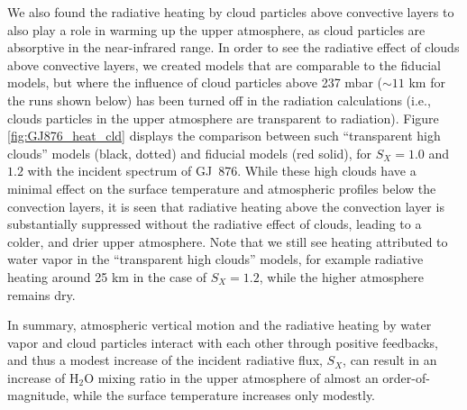 \documentclass[11pt,numberedappendix,twocolappendix,]{emulateapj}
\def\water{H$_2$O }
\newcommand{\dsa}[1]{{\color{blue}#1}}
\begin{document}
We also found the radiative heating by cloud particles above convective layers to also play a role in warming up the upper atmosphere, as cloud particles are absorptive in the near-infrared range. 
In order to see the radiative effect of clouds above convective layers, we created models that are comparable to the fiducial models, but where the  influence of cloud particles above 237 mbar ($\sim 11$ km for the runs shown below) has been turned off in the radiation calculations (i.e., clouds particles in the upper atmosphere are transparent to radiation). 
Figure \ref{fig:GJ876_heat_cld} displays the comparison between such ``transparent high clouds'' models (black, dotted) and fiducial models (red solid), for $S_X=1.0$ and $1.2$ with the incident spectrum of GJ~876. 
While these high clouds have a minimal effect on the surface temperature and atmospheric profiles below the convection layers, it is seen that radiative heating above the convection layer is substantially suppressed without the radiative effect of clouds, leading to a colder, and drier upper atmosphere. 
Note that we still see heating attributed to water vapor in the ``transparent high clouds'' models, for example radiative heating around 25 km in the case of $S_X=1.2$, while the higher atmosphere remains dry. 

In summary, atmospheric vertical motion and the radiative heating by water vapor and cloud particles interact with each other through positive feedbacks, and thus a modest increase of the incident radiative flux, $S_X$, can result in  an increase of \water mixing ratio in the upper atmosphere of almost an order-of-magnitude, while the surface temperature increases only modestly. 

\end{document}
